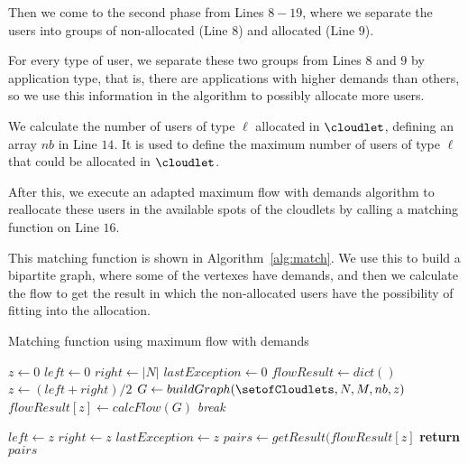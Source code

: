 \documentclass[English]{ic-tese-v3}
\begin{document}
Then we come to the second phase from Lines $8-19$, where we separate the users into groups of non-allocated (Line $8$) and allocated (Line $9$).

For every type of user, we separate these two groups from Lines $8$ and $9$ by application type, that is, there are applications with higher demands than others, so we use this information in the algorithm to possibly allocate more users.

We calculate the number of users of type $\ell$ allocated in $\cloudlet$, defining an array $nb$ in Line $14$. It is used to define the maximum number of users of type $\ell$ that could be allocated in $\cloudlet$.

After this, we execute an adapted maximum flow with demands algorithm to reallocate these users in the available spots of the cloudlets by calling a matching function on Line $16$.

This matching function is shown in Algorithm~\ref{alg:match}. We use this to build a bipartite graph, where some of the vertexes have demands, and then we calculate the flow to get the result in which the non-allocated users have the possibility of fitting into the allocation.

\algrenewcommand{}
\begin{algorithm}
    \caption{Matching function using maximum flow with demands}\label{alg:match}
    {\fontsize{8}{8}\selectfont
        \begin{algorithmic}[1]
            \State $z \gets 0$
            \State $left \gets 0$
            \State $right \gets |N|$
            \State $lastException \gets 0$
            \State $flowResult \gets dict()$
                \try
                    \State $z \gets (left + right) / 2$
                    \State $G \gets buildGraph(\setofCloudlets, N, M, nb, z)$
                    \State $flowResult[z] \gets calcFlow(G)$
                        \State \emph{break}
                    \EndIf

                    \State $left \gets z$
                \catch
                    \State $right \gets z$
                    \State $lastException \gets z$
                \endtry
            \EndWhile
            \State $pairs \gets getResult(flowResult[z]$
            \State \textbf{return} $pairs$
        \EndFunction
        \end{algorithmic}}
\end{algorithm}
\end{document}
